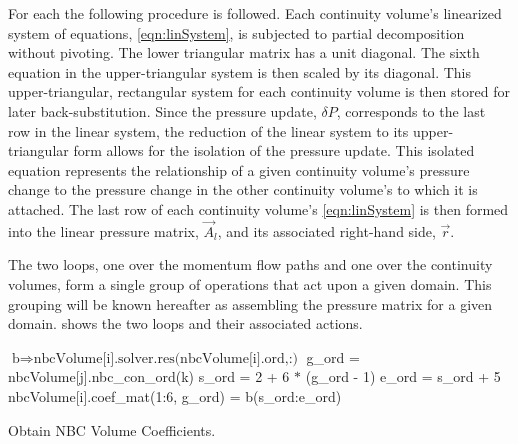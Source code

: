 For each  the following procedure is followed.
Each continuity volume's linearized system of equations, \eqref{eqn:linSystem}, is subjected to partial  decomposition without pivoting.
The lower triangular matrix has a unit diagonal.
The sixth equation in the upper-triangular system is then scaled by its diagonal.
This upper-triangular, rectangular system for each continuity volume is then stored for later back-substitution.
Since the pressure update, $\delta P$, corresponds to the last row in the linear system, the reduction of the linear system to its upper-triangular form allows for the isolation of the pressure update.
This isolated equation represents the relationship of a given continuity volume's pressure change to the pressure change in the other continuity volume's to which it is attached.
The last row of each continuity volume's \eqref{eqn:linSystem} is then formed into the linear pressure matrix, $\vec{A}_{l}$, and its associated right-hand side, $\vec{r}$.

The two loops, one over the momentum flow paths and one over the continuity volumes, form a single group of operations that act upon a given domain.
This grouping will be known hereafter as assembling the pressure matrix for a given domain.
 shows the two loops and their associated actions.

\begin{algo}[ht!]
\setlength{\baselineskip}{0.625\baselineskip}
\begin{algorithmic}[1]
	\Set $\text{b} \Rightarrow \text{nbcVolume[i].solver.res(nbcVolume[i].ord,:)}$
			\Set g\_ord = nbcVolume[j].nbc\_con\_ord(k)
			\Set s\_ord = 2 + 6 $*$ (g\_ord - 1)
			\Set e\_ord = s\_ord + 5
			\Set nbcVolume[i].coef\_mat(1:6, g\_ord) = b(s\_ord:e\_ord)
		\EndFor
	\EndFor
\EndFor
\end{algorithmic}
\caption{Obtain NBC Volume Coefficients.}
\label{alg:domDecompGetCoef}
\end{algo}

